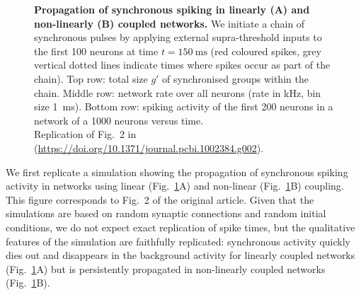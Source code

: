 \documentclass[10pt,a4paper,onecolumn]{article}
\begin{document}
\begin{figure}
\begin{subfigure}[t]{0.5\textwidth}
\end{subfigure}
\caption{\label{fig:raster}
\textbf{Propagation of synchronous spiking in linearly (A) and non-linearly (B) coupled networks.} We initiate a chain of synchronous pulses by applying external supra-threshold inputs to the first 100 neurons at time $t=\SI{150}{\milli\second}$ (red coloured spikes, grey vertical dotted lines indicate times where spikes occur as part of the chain). Top row: total size $g'$ of synchronised groups within the chain. Middle row: network rate over all neurons (rate in \si{\kilo\hertz}, bin size \SI{1}{\milli\second}). Bottom row: spiking activity of the first 200 neurons in a network of a 1000 neurons versus time.\\
Replication of Fig.~2 in \cite{Memmesheimer2012} (\url{https://doi.org/10.1371/journal.pcbi.1002384.g002}).}
\end{figure}

We first replicate a simulation showing the propagation of synchronous spiking activity in networks using linear (Fig.~\ref{fig:raster}A) and non-linear (Fig.~\ref{fig:raster}B) coupling. This figure corresponds to Fig.~2 of the original article. Given that the simulations are based on random synaptic connections and random initial conditions, we do not expect exact replication of spike times, but the qualitative features of the simulation are faithfully replicated: synchronous activity quickly dies out and disappears in the background activity for linearly coupled networks (Fig.~\ref{fig:raster}A) but is persistently propagated in non-linearly coupled networks (Fig.~\ref{fig:raster}B).
\end{document}
